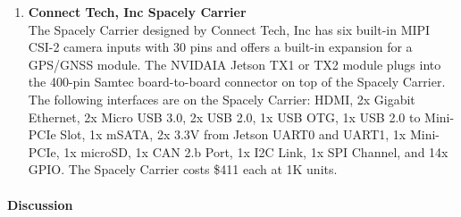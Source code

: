 \begin{enumerate}
		\item\textbf{Connect Tech, Inc Spacely Carrier}\\
			The Spacely Carrier designed by Connect Tech, Inc has six built-in MIPI CSI-2 camera 
			inputs with 30 pins and offers a built-in expansion for a GPS/GNSS module. The NVIDAIA 
			Jetson TX1 or TX2 module plugs into the 400-pin Samtec board-to-board connector on top 
			of the Spacely Carrier. The following interfaces are on the Spacely Carrier: HDMI, 2x 
			Gigabit Ethernet, 2x Micro USB 3.0, 2x USB 2.0, 1x USB OTG, 1x USB 2.0 to Mini-PCIe 
			Slot, 1x mSATA, 2x 3.3V from Jetson UART0 and UART1, 1x Mini-PCIe, 1x microSD, 1x CAN 2.b 
			Port, 1x I2C Link, 1x SPI Channel, and 14x GPIO\cite{SpacelyUG}. The Spacely Carrier 
			costs \$411 each at 1K units.\\
	\end{enumerate}

\paragraph{Discussion}

